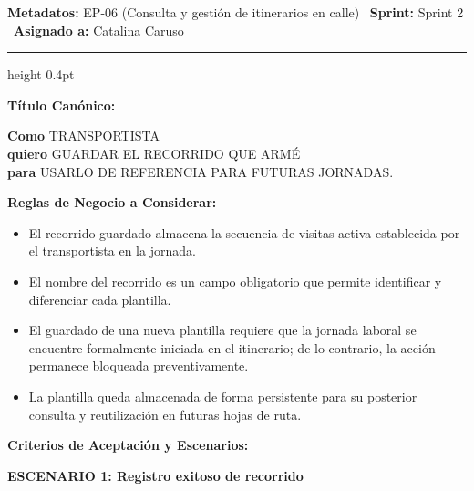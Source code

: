 \documentclass[a4paper,9pt]{article}
\begin{document}
\begin{tcolorbox}[hucard, title={\textbf{HU-26: GUARDAR RECORRIDO} \hfill \scriptsize \colorbox{tealstatus}{\textbf{\ Accepted\ }} \quad \colorbox{white}{\textcolor{primarydark}{\textbf{\ 5 pts\ }}}}]
\vspace{-1pt}
\noindent\textbf{\footnotesize Metadatos:} EP-06 (Consulta y gestión de itinerarios en calle) \textbar\ \textbf{Sprint:} Sprint 2 \textbar\ \textbf{Asignado a:} Catalina Caruso\par\vspace{2pt}
\hrule height 0.4pt\par\vspace{3pt}
\noindent\textbf{\footnotesize Título Canónico:}\par\vspace{1pt}
{\small \textbf{Como} TRANSPORTISTA \\ \textbf{quiero} GUARDAR EL RECORRIDO QUE ARMÉ \\ \textbf{para} USARLO DE REFERENCIA PARA FUTURAS JORNADAS.}\par\vspace{3pt}
\noindent\textbf{\footnotesize Reglas de Negocio a Considerar:}\par\vspace{1pt}
{\footnotesize
\begin{itemize}[leftmargin=12pt, nosep, itemsep=1.5pt, topsep=1pt]
\item El recorrido guardado almacena la secuencia de visitas activa establecida por el transportista en la jornada.
\item El nombre del recorrido es un campo obligatorio que permite identificar y diferenciar cada plantilla.
\item El guardado de una nueva plantilla requiere que la jornada laboral se encuentre formalmente iniciada en el itinerario; de lo contrario, la acción permanece bloqueada preventivamente.
\item La plantilla queda almacenada de forma persistente para su posterior consulta y reutilización en futuras hojas de ruta.
\end{itemize}
}\par\vspace{3pt}
\noindent\textbf{\footnotesize Criterios de Aceptación y Escenarios:}\par\vspace{2pt}
{\footnotesize
\noindent\textbf{\textcolor{secondarydark}{ESCENARIO 1:  Registro exitoso de recorrido}}\par\vspace{1pt}
}
\end{tcolorbox}
\end{document}
